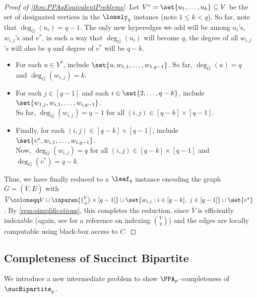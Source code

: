 \begin{proof}[Proof of \autoref{thm:PPAqEquivalentProblems}]
Let $V^* = \set{u_1, \ldots, u_k} \subseteq V$ be the set of designated vertices in the $\lonely_q$ instance (note $1 \le k < q$). So far, note that $\deg_{\overline{G}}(u_i) = q-1$. The only new hyperedges we add will be among $u_i$'s, $w_{i,j}$'s and $v^*$, in such a way that $\deg_{\overline{G}}(u_i)$ will become $q$, the degree of all $w_{i,j}$'s will also be $q$ and degree of $v^*$ will be $q-k$.
\begin{itemize}[label=$\triangleright$, itemsep=3pt]
\item For each $u \in V^*$, include $\set{u, w_{1,1}, \ldots, w_{1,q-1}}$. So far, $\deg_{\overline{G}}(u) = q$ and $\deg_{\overline{G}}(w_{1,j}) = k$.
\item For each $j \in [q-1]$ and each $i \in \set{2, \ldots, q-k}$, include $\set{w_{1,j}, w_{i,1}, \ldots, w_{i,q-1}}$.\\
So far, $\deg_{\overline{G}}(w_{i,j}) = q-1$ for all $(i,j) \in [q-k] \times [q-1]$.
\item Finally, for each $(i,j) \in [q-k] \times [q-1]$, include $\set{v^*, w_{i,1}, \ldots, w_{i,q-1}}$.\\
Now, $\deg_{\overline{G}}(w_{i,j}) = q$ for all $(i,j) \in [q-k] \times [q-1]$ and $\deg_{\overline{G}}(v^*) = q-k$.
\end{itemize}

Thus, we have finally reduced to a $\leaf_q$ instance encoding the graph $\overline{G} = (\overline{V}, \overline{E})$ with $\overline{V} \coloneqq V \cup  \inparen{\binom{V}{q} \times [q-1]} \cup \set{w_{i,j} : i \in [q-k],\ j \in [q-1]} \cup \set{v^*}$. By \autoref{rem:simplifications}, this completes the reduction, since $\overline{V}$ is efficiently indexable (again, see \cite{r31} for a reference on indexing $\binom{V}{q}$) and the edges are locally computable using black-box access to $C$.
\end{proof}

\subsection{\boldmath Completeness of Succinct Bipartite}\label{sec:sucBipartite}


We introduce a new intermediate problem to show $\PPA_p$--completeness of $\sucBipartite_p$.\\[1mm]


